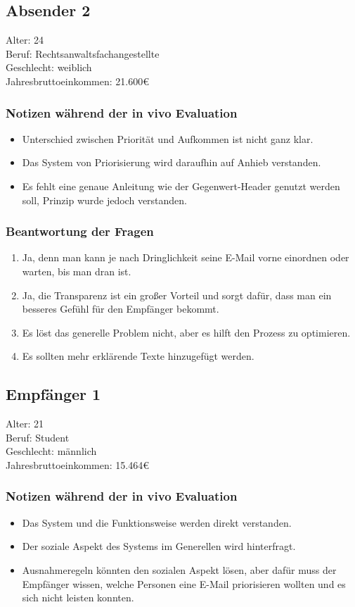 \subsection{Absender 2}
Alter: 24 \\
Beruf: Rechtsanwaltsfachangestellte \\
Geschlecht: weiblich \\
Jahresbruttoeinkommen: 21.600€

\subsubsection*{Notizen während der in vivo Evaluation}
\begin{itemize}
    \item Unterschied zwischen Priorität und Aufkommen ist nicht ganz klar.
    \item Das System von Priorisierung wird daraufhin auf Anhieb verstanden.
    \item Es fehlt eine genaue Anleitung wie der Gegenwert-Header genutzt werden soll, Prinzip wurde jedoch verstanden.
\end{itemize}

\subsubsection*{Beantwortung der Fragen}
\begin{enumerate}
\item Ja, denn man kann je nach Dringlichkeit seine E-Mail vorne einordnen oder warten, bis man dran ist.
\item Ja, die Transparenz ist ein großer Vorteil und sorgt dafür, dass man ein besseres Gefühl für den Empfänger bekommt.
\setcounter{enumi}{4}
\item Es löst das generelle Problem nicht, aber es hilft den Prozess zu optimieren.
\item Es sollten mehr erklärende Texte hinzugefügt werden.
\end{enumerate}

\subsection{Empfänger 1}
Alter: 21 \\
Beruf: Student \\
Geschlecht: männlich \\
Jahresbruttoeinkommen: 15.464€

\subsubsection*{Notizen während der in vivo Evaluation}
\begin{itemize}
    \item Das System und die Funktionsweise werden direkt verstanden.
    \item Der soziale Aspekt des Systems im Generellen wird hinterfragt.
    \item Ausnahmeregeln könnten den sozialen Aspekt lösen, aber dafür muss der Empfänger wissen, welche Personen eine E-Mail priorisieren wollten und es sich nicht leisten konnten.
\end{itemize}

